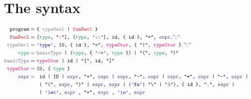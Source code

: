\documentclass{article}
\begin{document}
	\section{The syntax}
	\begin{align*}
	\texttt{program}  =\ & \texttt{\{ \color{gray}typeDecl \color{black} | \color{red}funDecl \color{black} \}}\\
	\texttt{\color{red}funDecl\color{black}} =\ & \texttt{[\color{ForestGreen}type\color{black}, ":"], [\color{ForestGreen}type\color{black}, '::'], id, \{ id \}, "=", \color{RoyalPurple}expr\color{black}}, ";"\\
	\texttt{\color{gray}typeDecl\color{black}} =\ &\texttt{\color{blue}'type'\color{black}, ID, \{ id \}, "=", \color{RubineRed}typeCtor\color{black}, \{ "|", \color{RubineRed}typeCtor \color{black} \}}, ";"\\
	\texttt{\color{ForestGreen}type\color{black}} =\ &\texttt{\color{CadetBlue}basicType \color{black} | (\color{ForestGreen}type\color{black}, \{ '->', \color{ForestGreen}type \color{black} \}) | "(", \color{ForestGreen}type\color{black}, ")"}\\
	\texttt{\color{CadetBlue}basicType} =\ &	\texttt{\color{RubineRed}typeCtor \color{black}| id | "[", id, "]"}\\
	\texttt{\color{RubineRed}typeCtor\color{black}} =\ & \texttt{ID, \{ \color{ForestGreen}type \color{black} \}}\\
	\texttt{\color{RoyalPurple}expr\color{black}} =\ &  \texttt{
		id
		| ID
		| \color{RoyalPurple}expr\color{black}, "+", \color{RoyalPurple}expr \color{black} 
		| \color{RoyalPurple}expr\color{black}, "-", \color{RoyalPurple}expr \color{black} 
		| \color{RoyalPurple}expr\color{black}, "*", \color{RoyalPurple}expr \color{black}
		| "-", \color{RoyalPurple}expr \color{black}
		|}\\
	&\texttt{
		| "(", \color{RoyalPurple}expr\color{black}, ")" 
		| \color{RoyalPurple}expr\color{black}, \color{RoyalPurple}expr \color{black} 
		| (\color{blue}'fn'\color{black} | "\char`\\" | "$\lambda$"), \{ id \}, ".", \color{RoyalPurple}expr \color{black}
		|}\\
	&\texttt{
		| \color{blue}'let'\color{black}, 
		\color{RoyalPurple}expr \color{black}, "=",	\color{RoyalPurple}expr \color{black},	 \color{blue}'in'\color{black}, \color{RoyalPurple}expr \color{black} 
}
\end{align*}
\end{document}
